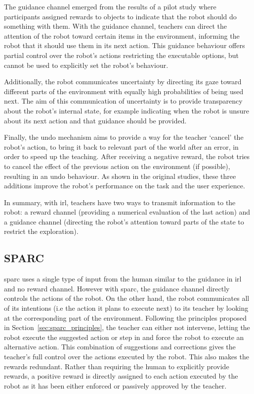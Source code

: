 The guidance channel emerged from the results of a pilot study where participants assigned rewards to objects to indicate that the robot should do something with them. With the guidance channel, teachers can direct the attention of the robot toward certain items in the environment, informing the robot that it should use them in its next action. This guidance behaviour offers partial control over the robot's actions restricting the executable options, but cannot be used to explicitly set the robot's behaviour. 

Additionally, the robot communicates uncertainty by directing its gaze toward different parts of the environment with equally high probabilities of being used next. The aim of this communication of uncertainty is to provide transparency about the robot's internal state, for example indicating when the robot is unsure about its next action and that guidance should be provided. 

Finally, the undo mechanism aims to provide a way for the teacher `cancel' the robot's action, to bring it back to relevant part of the world after an error, in order to speed up the teaching. After receiving a negative reward, the robot tries to cancel the effect of the previous action on the environment (if possible), resulting in an undo behaviour. As shown in the original studies, these three additions improve the robot's performance on the task and the user experience.

In summary, with \gls{irl}, teachers have two ways to transmit information to the robot: a reward channel (providing a numerical evaluation of the last action) and a guidance channel (directing the robot's attention toward parts of the state to restrict the exploration).

\subsection{SPARC}

\gls{sparc} uses a single type of input from the human similar to the guidance in \gls{irl} and no reward channel. However with \gls{sparc}, the guidance channel directly controls the actions of the robot. On the other hand, the robot communicates all of its intentions (i.e the action it plans to execute next) to its teacher by looking at the corresponding part of the environment. Following the principles proposed in Section~\ref{sec:sparc_principles}, the teacher can either not intervene, letting the robot execute the suggested action or step in and force the robot to execute an alternative action. This combination of suggestions and corrections gives the teacher's full control over the actions executed by the robot. This also makes the rewards redundant. Rather than requiring the human to explicitly provide rewards, a positive reward is directly assigned to each action executed by the robot as it has been either enforced or passively approved by the teacher.

